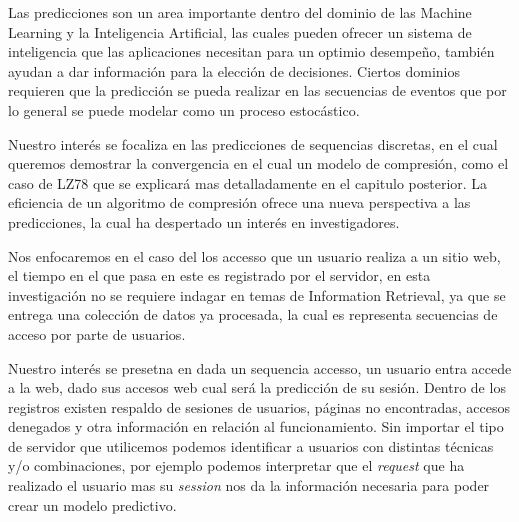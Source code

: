 







Las predicciones son un area importante dentro del dominio de las Machine Learning y la Inteligencia Artificial, las cuales pueden ofrecer un sistema de inteligencia que las aplicaciones necesitan para un optimio desempeño, también ayudan a dar información para la elección de decisiones. Ciertos dominios requieren que la predicción se pueda realizar en las secuencias de eventos que por lo general se puede modelar como un proceso estocástico. 

Nuestro interés se focaliza en las predicciones de sequencias discretas, en el cual queremos demostrar la convergencia en el cual un modelo de compresión, como el caso de LZ78 que se explicará mas detalladamente en el capitulo posterior. La eficiencia de un algoritmo de compresión ofrece una nueva perspectiva a las predicciones, la cual ha despertado un interés en investigadores.

Nos enfocaremos en el caso del los accesso que un usuario realiza a un sitio web, el tiempo en el que pasa en este es registrado por el servidor, en esta investigación no se requiere indagar en temas de Information Retrieval, ya que se entrega una colección de datos ya procesada, la cual es representa secuencias de acceso por parte de usuarios.




Nuestro interés se presetna en dada un sequencia accesso, un usuario entra accede a la web, dado sus accesos web cual será la predicción de su sesión.  Dentro de los registros existen respaldo de sesiones de usuarios, páginas no encontradas, accesos denegados y otra información en relación al funcionamiento. Sin importar el tipo de servidor que utilicemos podemos identificar a usuarios con distintas técnicas y/o combinaciones, por ejemplo podemos interpretar que el \emph{request} que ha realizado el usuario mas su \emph{session} nos da la información necesaria para poder crear un modelo predictivo.

